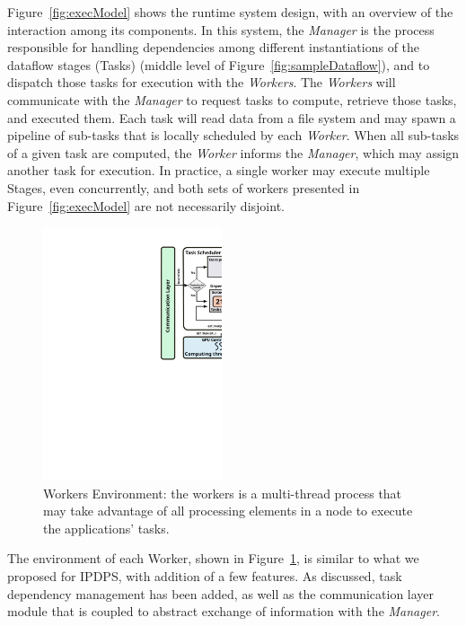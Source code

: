 Figure~\ref{fig:execModel} shows the runtime system design, with an overview of
the interaction among its components. In this system, the \emph{Manager} is the
process responsible for handling dependencies among different instantiations of
the dataflow stages (Tasks) (middle level of Figure~\ref{fig:sampleDataflow}),
and to dispatch those tasks for execution with the \emph{Workers}. The
\emph{Workers} will communicate with the \emph{Manager} to request tasks to
compute, retrieve those tasks, and executed them. Each task will read data from
a file system and may spawn a pipeline of sub-tasks that is locally scheduled
by each \emph{Worker}.  When all sub-tasks of a given task are computed, the
\emph{Worker} informs the \emph{Manager}, which may assign another task for
execution. In practice, a single worker may execute multiple Stages, even
concurrently, and both sets of workers presented in Figure~\ref{fig:execModel}
are not necessarily disjoint. 


\begin{figure}[ht]
\begin{center}
\includegraphics[width=0.47\textwidth]{images/worker-environment}
\caption{Workers Environment: the workers is a multi-thread process that may
take advantage of all processing elements in a node to execute the
applications' tasks.}
\label{fig:workerEnv}
\end{center}
\end{figure}

The environment of each Worker, shown in Figure~\ref{fig:workerEnv}, is similar
to what we proposed for IPDPS, with addition of a few features. As discussed,
task dependency management has been added, as well as the communication layer
module that is coupled to abstract exchange of information with the
\emph{Manager}.




